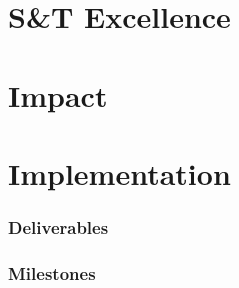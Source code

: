 \documentclass[noworkareas,deliverables,\classoptions]{euproposal}       %
\begin{document}
\begin{proposal}
\begin{abstract}
\end{abstract}

\newpage

\ifsubmit\else\setcounter{tocdepth}{4}\fi
\tableofcontents



\section{S\&T Excellence}



\section{Impact}



\section{Implementation}



\gantttaskchart[draft,xscale=.33,yscale=.33,milestones]

\subsubsection{Deliverables}\label{sec:deliverables}

\subsubsection{Milestones}\label{sec:milestones}






\end{proposal}
\end{document}

